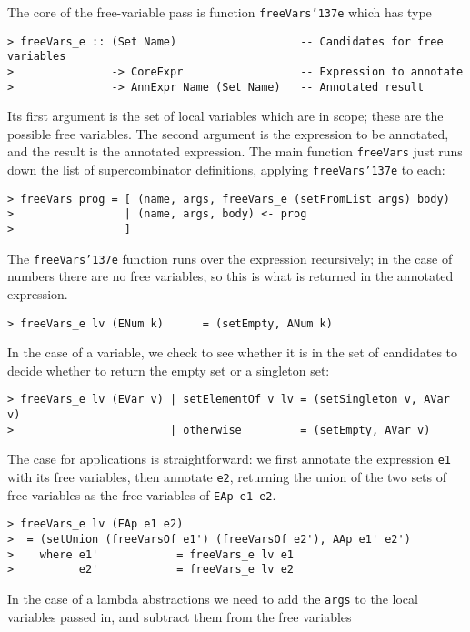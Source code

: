 The core of the free-variable pass is function \mbox{\tt freeVars{\char'137}e} which has type
\begin{verbatim}
> freeVars_e :: (Set Name)                   -- Candidates for free variables
>               -> CoreExpr                  -- Expression to annotate
>               -> AnnExpr Name (Set Name)   -- Annotated result
\end{verbatim}
Its first argument is the set of local variables which are in scope;
these are the possible free variables.  The second argument is the
expression to be annotated, and the result is the annotated
expression.  The main function \mbox{\tt freeVars} just runs down the list of
supercombinator definitions, applying \mbox{\tt freeVars{\char'137}e} to each:
\begin{verbatim}
> freeVars prog = [ (name, args, freeVars_e (setFromList args) body)
>                 | (name, args, body) <- prog
>                 ]
\end{verbatim}
%
The \mbox{\tt freeVars{\char'137}e} function runs over the expression recursively; in the
case of numbers there are no free variables, so this is what is
returned in the annotated expression.
\begin{verbatim}
> freeVars_e lv (ENum k)      = (setEmpty, ANum k)
\end{verbatim}
\par
In the case of a variable, we check to see whether it is in the set of
candidates to decide whether to return the empty set or a singleton set:
\begin{verbatim}
> freeVars_e lv (EVar v) | setElementOf v lv = (setSingleton v, AVar v)
>                        | otherwise         = (setEmpty, AVar v)
\end{verbatim}
\par
The case for applications is straightforward: we first annotate the
expression \mbox{\tt e1} with its free variables, then annotate \mbox{\tt e2}, returning
the union of the two sets of free variables as the free variables of
\mbox{\tt EAp\ e1\ e2}.
\begin{verbatim}
> freeVars_e lv (EAp e1 e2)
>  = (setUnion (freeVarsOf e1') (freeVarsOf e2'), AAp e1' e2')
>    where e1'            = freeVars_e lv e1
>          e2'            = freeVars_e lv e2
\end{verbatim}
In the case of a lambda abstractions we need to add the \mbox{\tt args} to the
local variables passed in, and subtract them from the free variables
